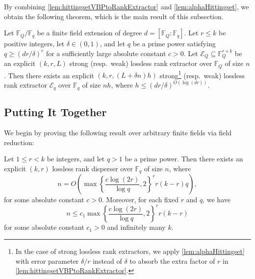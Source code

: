 \documentclass[11pt]{article}
\newcommand{\F}{\mathbb{F}}
\begin{document}
By combining \cref{lem:hittingsetVBPtoRankExtractor} and
\cref{lem:alphaHittingset}, we obtain the following theorem, which is the
main result of this subsection.

\begin{theorem}\label{thm:Qtoq}
Let $\F_Q/\F_q$ be a finite field extension of degree $d=[\F_Q:\F_q]$.
Let $r\le k$ be positive integers, let $\delta\in(0,1)$, and let $q$ be
a prime power satisfying $q\ge (dr/\delta)^c$ for a sufficiently large
absolute constant $c>0$.
Let $\mathcal{E}_Q\subseteq\F_Q^{r\times k}$ be an explicit $(k,r,L)$
strong (resp.\ weak) lossless rank extractor over $\F_Q$ of size $n$.
Then there exists an explicit $(k,r,(L+\delta n)h)$ strong\footnote{In the case of strong lossless rank extractors, we apply
\cref{lem:alphaHittingset} with error parameter $\delta/r$ instead of
$\delta$ to absorb the extra factor of $r$ in \cref{lem:hittingsetVBPtoRankExtractor}.} (resp.\ weak) lossless
rank extractor $\mathcal{E}_q$ over $\F_q$ of size $nh$, where $h\le (dr/\delta)^{O(\log(dr))}$.
\end{theorem}

\subsection{Putting It Together} \label{sec:combine}

We begin by proving the following result over arbitrary finite fields via field reduction:

\begin{theorem}\label{thm:rcsmall}
Let $1\le r< k$ be integers, and let $q>1$ be a prime power. Then there exists an explicit $(k,r)$ lossless rank disperser over $\F_q$ of size $n$, where
\[
n = O\!\left(\max\left\{\frac{c\log (2r)}{\log q},2\right\}^r r(k-r)q\right),
\]
for some absolute constant $c>0$. Moreover, for each fixed $r$ and $q$, we have
\[
n \le c_1 \max\left\{\frac{c\log (2r)}{\log q},2\right\}^r r(k-r)
\]
for some absolute constant $c_1>0$ and infinitely many $k$.
\end{theorem}
\end{document}
